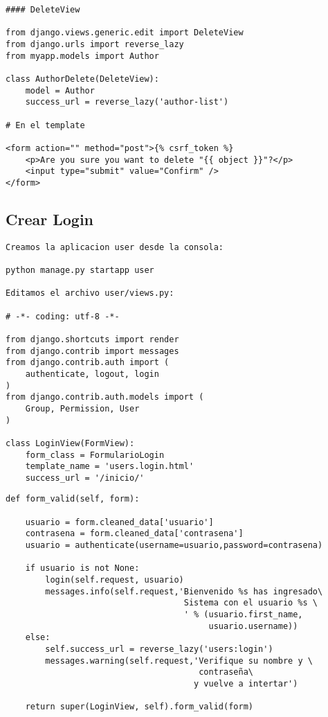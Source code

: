 \documentclass[xcolor=dvipsnames]{beamer}
\begin{document}
\begin{frame}[fragile]
\begin{verbatim}
#### DeleteView

from django.views.generic.edit import DeleteView
from django.urls import reverse_lazy
from myapp.models import Author

class AuthorDelete(DeleteView):
    model = Author
    success_url = reverse_lazy('author-list')
    
# En el template

<form action="" method="post">{% csrf_token %}
    <p>Are you sure you want to delete "{{ object }}"?</p>
    <input type="submit" value="Confirm" />
</form>

\end{verbatim}
\end{frame}

\subsection{Crear Login}
\begin{frame}[fragile]
\begin{verbatim}
Creamos la aplicacion user desde la consola:

python manage.py startapp user

Editamos el archivo user/views.py:

# -*- coding: utf-8 -*-

from django.shortcuts import render
from django.contrib import messages
from django.contrib.auth import (
    authenticate, logout, login
)
from django.contrib.auth.models import (
    Group, Permission, User
)

class LoginView(FormView):
    form_class = FormularioLogin
    template_name = 'users.login.html'
    success_url = '/inicio/'
\end{verbatim}
\end{frame}

\begin{frame}[fragile]
\begin{verbatim}
def form_valid(self, form):
        
    usuario = form.cleaned_data['usuario']
    contrasena = form.cleaned_data['contrasena']
    usuario = authenticate(username=usuario,password=contrasena)
        
    if usuario is not None:
        login(self.request, usuario)
        messages.info(self.request,'Bienvenido %s has ingresado\
                                    Sistema con el usuario %s \
                                    ' % (usuario.first_name,
                                         usuario.username))
    else:
        self.success_url = reverse_lazy('users:login')
        messages.warning(self.request,'Verifique su nombre y \
                                       contraseña\
                                      y vuelve a intertar')

    return super(LoginView, self).form_valid(form)
 
\end{verbatim}
\end{frame}
\end{document}
